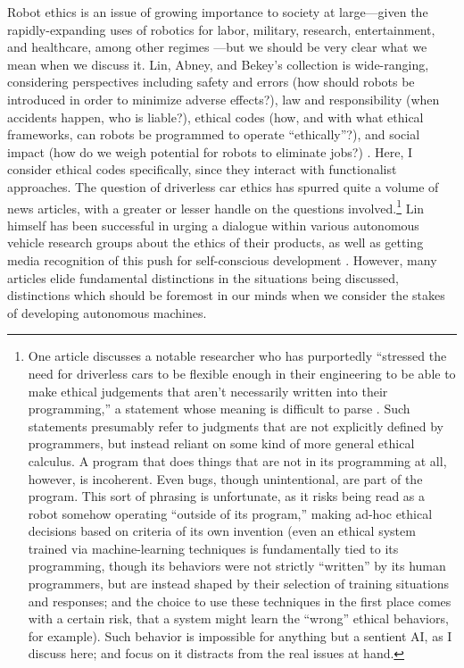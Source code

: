 Robot ethics is an issue of growing importance to society at
large---given the rapidly-expanding uses of robotics for labor, military,
research, entertainment, and healthcare, among other regimes \cite[p. 5-6]{patrickLin}---but we should be very clear what we mean when we
discuss it. Lin, Abney, and Bekey's collection is wide-ranging,
considering perspectives including safety and errors (how should 
robots be introduced in order to minimize adverse effects?), law and
responsibility (when accidents happen, who is liable?), ethical codes
(how, and with what ethical frameworks, can robots be programmed to
operate ``ethically''?), and social impact
(how do we weigh potential for robots to eliminate
jobs?) \cite{robotEthics}. Here, I consider ethical codes specifically,
since they interact with functionalist approaches. The question of
driverless car ethics has spurred quite a volume of news articles,
with a greater or lesser handle on the questions
involved.\footnote{One article discusses a notable
  researcher who has purportedly ``stressed the need for driverless
  cars to be flexible enough in their 
engineering to be able to make ethical judgements that aren't
necessarily written into their programming,'' a statement whose
meaning is difficult to parse \cite{jessicaDavies}. Such statements
presumably 
refer to judgments that are not explicitly defined by programmers, but
instead reliant on some kind of more general ethical calculus. A
program that does things that are not in its programming at all,
however, is incoherent. Even bugs, though unintentional, are part of
the program. This sort of phrasing is unfortunate, as it
risks being read as a robot somehow operating ``outside of its
program,'' making ad-hoc ethical decisions based on criteria of its
own invention (even an ethical system trained via machine-learning
techniques is fundamentally tied to its programming, though its
behaviors were not strictly ``written'' by its human programmers, but
are instead shaped by their selection of training situations and
responses; and the choice to use these techniques in the first place
comes with a certain risk, that a system
might learn the ``wrong'' ethical behaviors, for example). Such
behavior is impossible for anything but a sentient
AI, as I discuss here; and focus on it distracts from the real issues
at hand.} Lin himself has been successful in urging a dialogue
within various autonomous vehicle research groups about the ethics of
their products, as well as getting media recognition of this push for
self-conscious development \cite{timeEthics}. However, many articles
elide fundamental distinctions in the situations being discussed,
distinctions which should be foremost in our minds when we consider
the stakes of developing autonomous machines.

